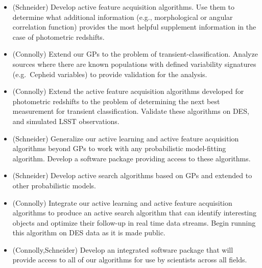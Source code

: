 \documentclass[prd,nofootbib,floatfix,11pt,tightenlines,nofootinbib]{revtex4}
\begin{document}
\vspace{.5\baselineskip}
\begin{itemize}

\item (Schneider) Develop active feature acquisition algorithms.  Use them
  to determine what additional information (e.g., morphological or angular
  correlation function) provides the most helpful supplement information in
  the case of photometric redshifts.

\item (Connolly) Extend our GPs to the problem of transient-classification.
  Analyze sources where there are known populations with defined
  variability signatures (e.g.\ Cepheid variables) to provide validation
  for the analysis.

\item (Connolly) Extend the active feature acquisition algorithms developed
  for photometric redshifts to the problem of determining the next best
  measurement for transient classification.  Validate these algorithms on
  DES, and simulated LSST observations.

\item (Schneider) Generalize our active learning and active feature
  acquisition algorithms beyond GPs to work with any probabilistic
  model-fitting algorithm.  Develop a software package providing access to
  these algorithms.

\end{itemize}
\vspace{.5\baselineskip}

 \vspace{.5\baselineskip}

\begin{itemize}

\item (Schneider) Develop active search algorithms based on GPs and
  extended to other probabilistic models.

\item (Connolly) Integrate our active learning and active feature
  acquisition algorithms to produce an active search algorithm that can
  identify interesting objects and optimize their follow-up in real time
  data streams.  Begin running this algorithm on DES data as it is made
  public.

\item (Connolly,Schneider) Develop an integrated software package that will
  provide access to all of our algorithms for use by scientists across all
  fields.


\end{itemize}
\end{document}

